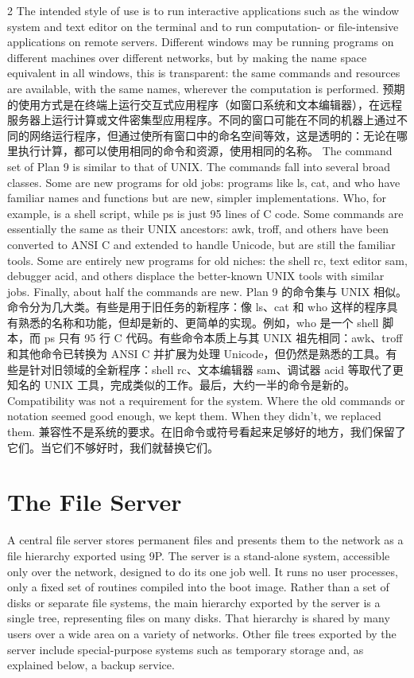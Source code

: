 \documentclass{article}
\begin{document}
\begin{paracol}{2}
\switchcolumn*
The intended style of use is to run interactive applications such as the window system and text editor on the terminal and to run computation- or file-intensive applications on remote servers. Different windows may be running programs on different machines over different networks, but by making the name space equivalent in all windows, this is transparent: the same commands and resources are available, with the same names, wherever the computation is performed.
\switchcolumn
预期的使用方式是在终端上运行交互式应用程序（如窗口系统和文本编辑器），在远程服务器上运行计算或文件密集型应用程序。不同的窗口可能在不同的机器上通过不同的网络运行程序，但通过使所有窗口中的命名空间等效，这是透明的：无论在哪里执行计算，都可以使用相同的命令和资源，使用相同的名称。
\switchcolumn*
The command set of Plan 9 is similar to that of UNIX. The commands fall into several broad classes. Some are new programs for old jobs: programs like ls, cat, and who have familiar names and functions but are new, simpler implementations. Who, for example, is a shell script, while ps is just 95 lines of C code. Some commands are essentially the same as their UNIX ancestors: awk, troff, and others have been converted to ANSI C and extended to handle Unicode, but are still the familiar tools. Some are entirely new programs for old niches: the shell rc, text editor sam, debugger acid, and others displace the better-known UNIX tools with similar jobs. Finally, about half the commands are new.
\switchcolumn
Plan 9 的命令集与 UNIX 相似。命令分为几大类。有些是用于旧任务的新程序：像 ls、cat 和 who 这样的程序具有熟悉的名称和功能，但却是新的、更简单的实现。例如，who 是一个 shell 脚本，而 ps 只有 95 行 C 代码。有些命令本质上与其 UNIX 祖先相同：awk、troff 和其他命令已转换为 ANSI C 并扩展为处理 Unicode，但仍然是熟悉的工具。有些是针对旧领域的全新程序：shell rc、文本编辑器 sam、调试器 acid 等取代了更知名的 UNIX 工具，完成类似的工作。最后，大约一半的命令是新的。
\switchcolumn*
Compatibility was not a requirement for the system. Where the old commands or notation seemed good enough, we kept them. When they didn't, we replaced them.
\switchcolumn
兼容性不是系统的要求。在旧命令或符号看起来足够好的地方，我们保留了它们。当它们不够好时，我们就替换它们。
\switchcolumn*
\section*{The File Server}
A central file server stores permanent files and presents them to the network as a file hierarchy exported using 9P. The server is a stand-alone system, accessible only over the network, designed to do its one job well. It runs no user processes, only a fixed set of routines compiled into the boot image. Rather than a set of disks or separate file systems, the main hierarchy exported by the server is a single tree, representing files on many disks. That hierarchy is shared by many users over a wide area on a variety of networks. Other file trees exported by the server include special-purpose systems such as temporary storage and, as explained below, a backup service.
\switchcolumn

\end{paracol}
\end{document}

